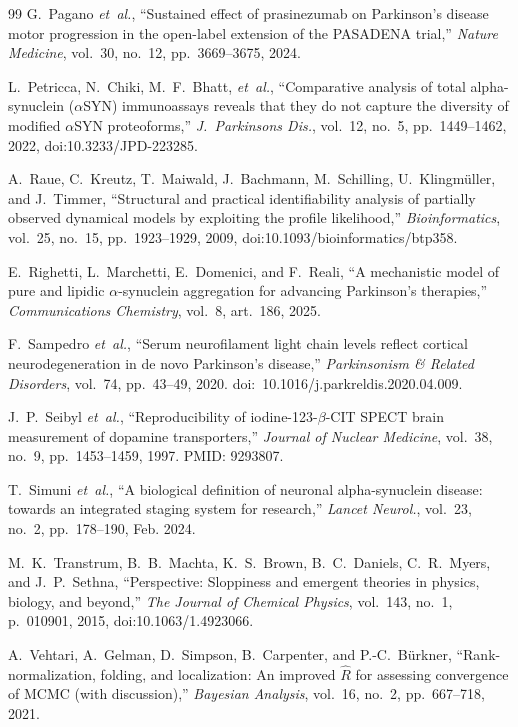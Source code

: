 \begin{thebibliography}{99}
G.~Pagano \textit{et~al.}, ``Sustained effect of prasinezumab on Parkinson's disease motor progression in the open-label extension of the PASADENA trial,'' \textit{Nature Medicine}, vol.~30, no.~12, pp.~3669--3675, 2024.

L.~Petricca, N.~Chiki, M.~F.~Bhatt, \textit{et~al.}, ``Comparative analysis of total alpha-synuclein ($\alpha$SYN) immunoassays reveals that they do not capture the diversity of modified $\alpha$SYN proteoforms,'' \textit{J.~Parkinsons Dis.}, vol.~12, no.~5, pp.~1449--1462, 2022, doi:10.3233/JPD-223285.

A.~Raue, C.~Kreutz, T.~Maiwald, J.~Bachmann, M.~Schilling, U.~Klingm{\"u}ller, and J.~Timmer, ``Structural and practical identifiability analysis of partially observed dynamical models by exploiting the profile likelihood,'' \textit{Bioinformatics}, vol.~25, no.~15, pp.~1923--1929, 2009, doi:10.1093/bioinformatics/btp358.

E.~Righetti, L.~Marchetti, E.~Domenici, and F.~Reali, ``A mechanistic model of pure and lipidic $\alpha$-synuclein aggregation for advancing Parkinson's therapies,'' \textit{Communications Chemistry}, vol.~8, art.~186, 2025.

F.~Sampedro \textit{et~al.}, ``Serum neurofilament light chain levels reflect cortical neurodegeneration in de novo Parkinson's disease,'' \textit{Parkinsonism \& Related Disorders}, vol.~74, pp.~43--49, 2020. doi:~10.1016/j.parkreldis.2020.04.009.

J.~P.~Seibyl \textit{et~al.}, ``Reproducibility of iodine-123-$\beta$-CIT SPECT brain measurement of dopamine transporters,'' \textit{Journal of Nuclear Medicine}, vol.~38, no.~9, pp.~1453--1459, 1997. PMID: 9293807.

T.~Simuni \textit{et~al.}, ``A biological definition of neuronal alpha-synuclein disease: towards an integrated staging system for research,'' \textit{Lancet Neurol.}, vol.~23, no.~2, pp.~178--190, Feb. 2024.

M.~K.~Transtrum, B.~B.~Machta, K.~S.~Brown, B.~C.~Daniels, C.~R.~Myers, and J.~P.~Sethna, ``Perspective: Sloppiness and emergent theories in physics, biology, and beyond,'' \textit{The Journal of Chemical Physics}, vol.~143, no.~1, p.~010901, 2015, doi:10.1063/1.4923066.


A.~Vehtari, A.~Gelman, D.~Simpson, B.~Carpenter, and P.-C.~B{\"u}rkner, ``Rank-normalization, folding, and localization: An improved $\widehat{R}$ for assessing convergence of MCMC (with discussion),'' \textit{Bayesian Analysis}, vol.~16, no.~2, pp.~667--718, 2021.


\end{thebibliography}
